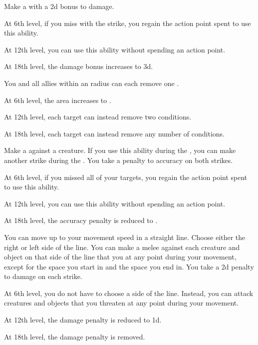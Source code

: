 {             Make a  with a \plus2d bonus to damage.
            \par At 6th level, if you miss with the strike, you regain the action point spent to use this ability.
            \par At 12th level, you can use this ability without spending an action point.
            \par At 18th level, the damage bonus increases to \plus3d.

             You and all allies within an \areamed radius can each remove one .
            \par At 6th level, the area increases to \arealarge.
            \par At 12th level, each target can instead remove two conditions.
            \par At 18th level, each target can instead remove any number of conditions.

             Make a  against a creature.
            If you use this ability during the , you can make another strike during the .
            You take a  penalty to accuracy on both strikes.
            \par At 6th level, if you missed all of your targets, you regain the action point spent to use this ability.
            \par At 12th level, you can use this ability without spending an action point.
            \par At 18th level, the accuracy penalty is reduced to .

             You can move up to your movement speed in a straight line.
            Choose either the right or left side of the line.
            You can make a melee  against each creature and object on that side of the line that you  at any point during your movement, except for the space you start in and the space you end in.
            You take a \minus2d penalty to damage on each strike.
            \par At 6th level, you do not have to choose a side of the line.
            Instead, you can attack creatures and objects that you threaten at any point during your movement.
            \par At 12th level, the damage penalty is reduced to \minus1d.
            \par At 18th level, the damage penalty is removed.

}
